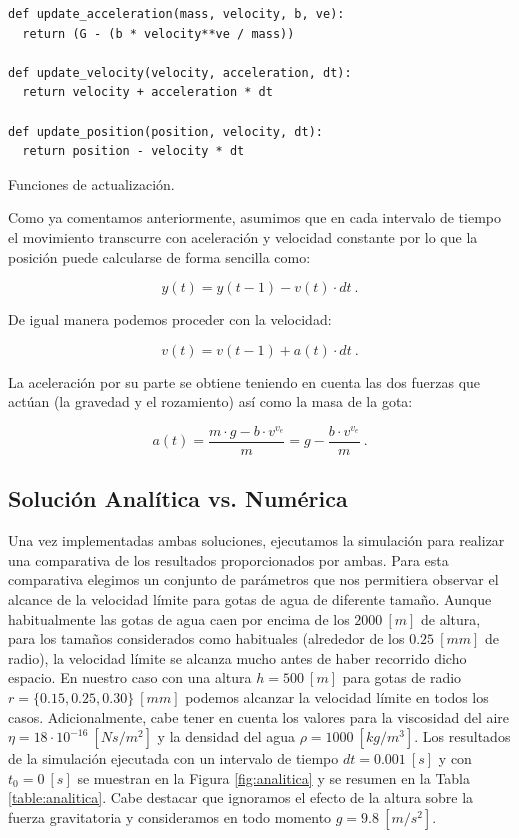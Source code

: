 \documentclass[journal]{IEEEtran}
\newenvironment{code}{\captionsetup{type=listing}}{\par\addvspace{\baselineskip}}
\begin{document}
\bigskip

\begin{code}
	\begin{verbatim}
def update_acceleration(mass, velocity, b, ve):
  return (G - (b * velocity**ve / mass))

def update_velocity(velocity, acceleration, dt):
  return velocity + acceleration * dt

def update_position(position, velocity, dt):
  return position - velocity * dt
	\end{verbatim}
  \caption{Funciones de actualización.}
  \label{code:functions}
\end{code}

Como ya comentamos anteriormente, asumimos que en cada intervalo de tiempo el movimiento transcurre con aceleración y velocidad constante por lo que la posición puede calcularse de forma sencilla como:

\begin{equation}
  y(t) = y(t-1) - v(t) \cdot dt~.
\end{equation}

De igual manera podemos proceder con la velocidad:

\begin{equation}
  v(t) = v(t-1) + a(t) \cdot dt~.
\end{equation}

La aceleración por su parte se obtiene teniendo en cuenta las dos fuerzas que actúan (la gravedad y el rozamiento) así como la masa de la gota:

\begin{equation}
  a(t) = \displaystyle\frac{m\cdot g - b \cdot v^{v_e}}{m} = g - \displaystyle\frac{b\cdot v^{v_e}}{m}~.
\end{equation}

\subsection{Solución Analítica vs. Numérica}

Una vez implementadas ambas soluciones, ejecutamos la simulación para realizar una comparativa de los resultados proporcionados por ambas. Para esta comparativa elegimos un conjunto de parámetros que nos permitiera observar el alcance de la velocidad límite para gotas de agua de diferente tamaño. Aunque habitualmente las gotas de agua caen por encima de los $2000~[m]$ de altura, para los tamaños considerados como habituales (alrededor de los $0.25~[mm]$ de radio), la
velocidad límite se alcanza mucho antes de haber recorrido dicho espacio. En nuestro caso con una altura $h = 500~[m]$ para gotas de radio $r = \{0.15, 0.25, 0.30\}~[mm]$ podemos alcanzar la velocidad límite en todos los casos. Adicionalmente, cabe tener en cuenta los valores para la viscosidad del aire $\eta = 18\cdot10^{-16}~[Ns/m^2]$ y la densidad del agua $\rho = 1000~[kg/m^3]$. Los resultados de la simulación ejecutada con un intervalo de tiempo $dt = 0.001~[s]$ y con $t_0 =
0~[s]$ se muestran en la Figura \ref{fig:analitica} y se resumen en la Tabla \ref{table:analitica}. Cabe destacar que ignoramos el efecto de la altura sobre la fuerza gravitatoria y consideramos en todo momento $g = 9.8~[m/s^2]$.
\end{document}
